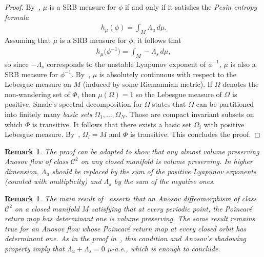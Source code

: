 \documentclass[letterpaper, 11pt]{article}
\numberwithin{equation}{section}
\newtheorem{rem}[thm]{Remark}
\begin{document}
\begin{proof}
By~\cite[Theorem A]{LY85}, $\mu$ is a SRB measure for $\phi$ if and only if it satisfies the \emph{Pesin entropy formula}
\begin{align*}
h_\mu(\phi) = \int_M \Lambda_u \, d\mu.
\end{align*}
Assuming that $\mu$ is a SRB measure for $\phi$, it follows that
\begin{align*}
h_\mu\big(\phi^{-1}\big) = \int_M - \Lambda_s \, d\mu,
\end{align*}
so since $- \Lambda_s$ corresponds to the unstable Lyapunov exponent of $\phi^{-1}$, $\mu$ is also a SRB measure for $\phi^{-1}$. By~\cite[Th\'{e}or\`{e}me (5.5)]{L84}, $\mu$ is absolutely continuous with respect to the Lebesgue measure on $M$ (induced by some Riemannian metric). If $\Omega$ denotes the non-wandering set of $\Phi$, then $\mu(\Omega) = 1$ so the Lebesgue measure of $\Omega$ is positive. Smale's spectral decomposition for $\Omega$ states that $\Omega$ can be partitioned into finitely many \emph{basic sets} $\Omega_1, \dots, \Omega_N$. Those are compact invariant subsets on which $\Phi$ is transitive. It follows that there exists a basic set $\Omega_i$ with positive Lebesgue measure. By~\cite[Corollary 5.7 (b)]{BR75}, $\Omega_i = M$ and $\Phi$ is transitive. This concludes the proof.
\end{proof}

\begin{rem} The proof can be adapted to show that any almost volume preserving Anosov flow of class $\mathcal{C}^2$  on any closed manifold is volume preserving.  In higher dimension, $\Lambda_u$  should be replaced by the sum of the positive Lyapunov exponents (counted with multiplicity) and $\Lambda_s$ by the sum of the negative ones.
\end{rem}

\begin{rem} The main result of~\cite{M22} asserts that an Anosov \emph{diffeomorphism} of class $\mathcal{C}^2$ on a closed manifold $M$ satisfying that at every periodic point, the Poincar\'{e} return map has determinant one is volume preserving. The same result remains true for an Anosov flow whose Poincar\'{e} return map at every closed orbit has determinant one. As in the proof in~\cite{M22}, this condition and Anosov's \emph{shadowing property} imply that $\Lambda_u + \Lambda_s=0$ $\mu$-a.e., which is enough to conclude.
\end{rem}

\printbibliography[heading=bibintoc, title={References}]
\end{document}
